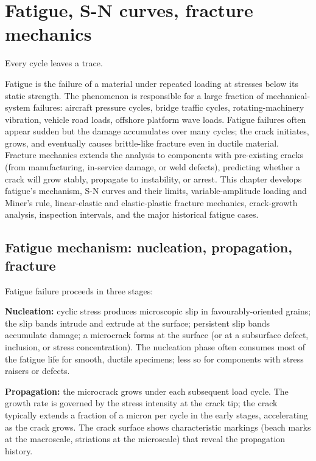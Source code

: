 \chapter{Fatigue, S-N curves, fracture mechanics}
\label{vol10:ch02}

\epigraph{Every cycle leaves a trace.}{}


\noindent
Fatigue is the failure of a material under repeated loading at stresses below its static strength. The phenomenon is responsible for a large fraction of mechanical-system failures: aircraft pressure cycles, bridge traffic cycles, rotating-machinery vibration, vehicle road loads, offshore platform wave loads. Fatigue failures often appear sudden but the damage accumulates over many cycles; the crack initiates, grows, and eventually causes brittle-like fracture even in ductile material. Fracture mechanics extends the analysis to components with pre-existing cracks (from manufacturing, in-service damage, or weld defects), predicting whether a crack will grow stably, propagate to instability, or arrest. This chapter develops fatigue's mechanism, S-N curves and their limits, variable-amplitude loading and Miner's rule, linear-elastic and elastic-plastic fracture mechanics, crack-growth analysis, inspection intervals, and the major historical fatigue cases.

\section{Fatigue mechanism: nucleation, propagation, fracture}

Fatigue failure proceeds in three stages:

\textbf{Nucleation:} cyclic stress produces microscopic slip in favourably-oriented grains; the slip bands intrude and extrude at the surface; persistent slip bands accumulate damage; a microcrack forms at the surface (or at a subsurface defect, inclusion, or stress concentration). The nucleation phase often consumes most of the fatigue life for smooth, ductile specimens; less so for components with stress raisers or defects.

\textbf{Propagation:} the microcrack grows under each subsequent load cycle. The growth rate is governed by the stress intensity at the crack tip; the crack typically extends a fraction of a micron per cycle in the early stages, accelerating as the crack grows. The crack surface shows characteristic markings (beach marks at the macroscale, striations at the microscale) that reveal the propagation history.

